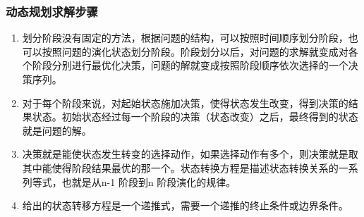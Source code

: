 \begin{frame}
    \frametitle{动态规划求解步骤}
    \begin{enumerate}
      \small
      \item {}
      
      划分阶段没有固定的方法，根据问题的结构，可以按照时间顺序划分阶段，也可以按照问题的演化状态划分阶段。阶段划分以后，对问题的求解就变成对各个阶段分别进行最优化决策，问题的解就变成按照阶段顺序依次选择的一个决策序列。
      \item {}
      
      对于每个阶段来说，对起始状态施加决策，使得状态发生改变，得到决策的结果状态。初始状态经过每一个阶段的决策（状态改变）之后，最终得到的状态就是问题的解。
      \item {}
    
      决策就是能使状态发生转变的选择动作，如果选择动作有多个，则决策就是取其中能使得阶段结果最优的那一个。状态转换方程是描述状态转换关系的一系列等式，也就是从n-1 阶段到n 阶段演化的规律。
      \item {}
    
      给出的状态转移方程是一个递推式，需要一个递推的终止条件或边界条件。
    \end{enumerate}
\end{frame}

